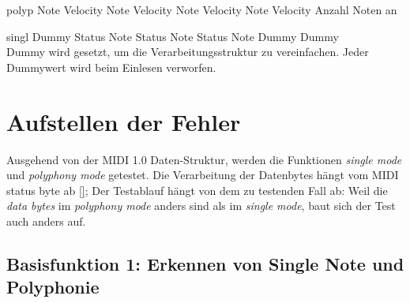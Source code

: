 polyp	\hspace{2mm} Note \hspace*{4mm} 	Velocity	\hspace*{2mm} Note \hspace*{2mm}  Velocity \hspace*{2mm} 	Note \hspace*{2mm} 	Velocity \hspace*{2mm} 	Note \hspace*{2mm} 	Velocity \hspace*{2mm}  Anzahl Noten an

singl	\hspace{3mm} Dummy \hspace*{2mm} 	Status	\hspace*{2mm} Note \hspace*{2mm}  Status \hspace*{4mm} 	Note \hspace*{2mm} 	Status \hspace*{3mm} 	Note \hspace*{3mm} 	Dummy \hspace*{2mm}  Dummy\\

Dummy wird gesetzt, um die Verarbeitungsstruktur zu vereinfachen. Jeder Dummywert wird beim Einlesen verworfen.\\
 
\section{Aufstellen der Fehler}\label{sec.testbench_fehler} 


Ausgehend von der MIDI 1.0 Daten-Struktur, werden die Funktionen \textit{single mode} und  \textit{polyphony mode} getestet. Die Verarbeitung der Datenbytes hängt vom MIDI status byte ab \ref{};
Der Testablauf hängt von dem zu testenden Fall ab: Weil die \textit{data bytes} im \textit{polyphony mode} anders sind als im \textit{single mode}, baut sich der Test auch anders auf.\\







\subsection*{Basisfunktion 1: Erkennen von Single Note und Polyphonie}
 


